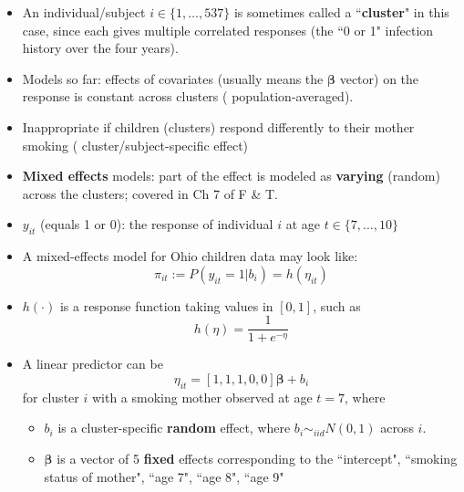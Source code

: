\documentclass{beamer}
\newcommand{\boldbeta}{{\boldsymbol \beta}}
\newenvironment{wideitemize}%
  {\begin{itemize}%
    \setlength{\parskip}{1em}}%
  {\end{itemize}}
\begin{document}
\begin{frame}
\begin{wideitemize}
\item An individual/subject $i \in \{1, \dots, 537\}$  is sometimes  called a ``{\bf cluster}" in this case, since each gives multiple correlated responses (the ``0 or 1" infection history over the four years). 
\item Models  so far: effects of covariates (usually means the $\boldbeta$ vector) on the response is constant across 
clusters ( population-averaged). 
\item Inappropriate if children (clusters) respond differently to their mother smoking  ( cluster/subject-specific effect)

\item
\textbf{Mixed effects} models: part of the effect is modeled as{ \bf varying} (random) across the clusters; covered in Ch 7 of F \& T. 



\end{wideitemize}




\end{frame}


\begin{frame}
\begin{wideitemize}
\item  $y_{it}$ (equals 1 or 0): the response of individual $i$ at age $t \in \{7, \dots,10 \}$
\item A mixed-effects model for Ohio children data may look like: 
\[\pi_{it} := P(y_{it} = 1|b_i) = h(\eta_{it})\] 

\item $h(\cdot)$ is a response function taking values in $[0,1]$, such as
\[
h(\eta) = \frac{1}{1 + e^{-\eta}}
\]

\item A linear predictor can be 
\[
\eta_{it} =[1, 1, 1, 0, 0] \boldbeta + b_i
\]
 for cluster $i$ with a smoking mother  observed at age $t = 7$, where
\begin{wideitemize}
\item 
$b_i$ is a cluster-specific {\bf random} effect, where $b_i \sim_{iid} N(0, 1)$ across $i$.

\item $\boldbeta$ is a vector of 5 {\bf fixed} effects  corresponding to the ``intercept", ``smoking status of mother", ``age 7", ``age 8", ``age 9"
\end{wideitemize}


\end{wideitemize}
\end{frame}
\end{document}
